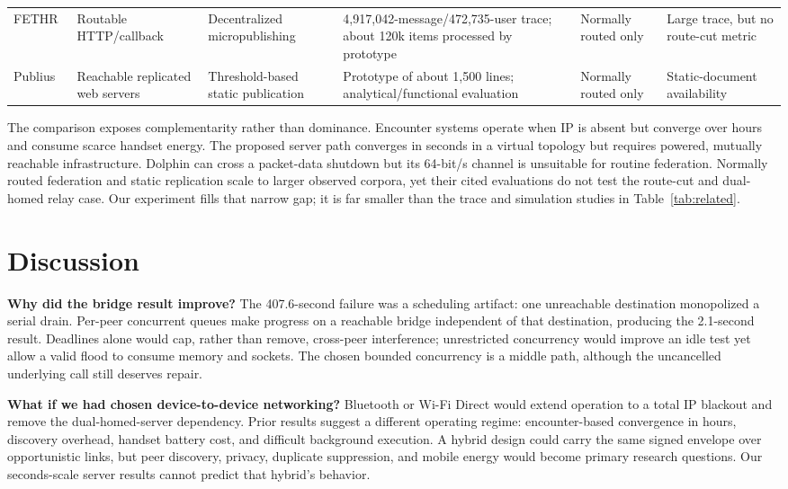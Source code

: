 \documentclass[sigconf,anonymous]{acmart}
\begin{document}
\begin{table}[t]
\begin{tabular}{p{1.55cm}p{2.05cm}p{1.55cm}p{3.35cm}p{2.1cm}p{2.55cm}}
FETHR~\cite{sandler2009fethr} & Routable HTTP/callback & Decentralized micropublishing & 4,917,042-message/472,735-user trace; about 120k items processed by prototype & Normally routed only & Large trace, but no route-cut metric \\
Publius~\cite{waldman2000publius} & Reachable replicated web servers & Threshold-based static publication & Prototype of about 1,500 lines; analytical/functional evaluation & Normally routed only & Static-document availability \\
\bottomrule
\end{tabular}
\end{table}

The comparison exposes complementarity rather than dominance. Encounter systems operate when IP is
absent but converge over hours and consume scarce handset energy. The proposed server path converges
in seconds in a virtual topology but requires powered, mutually reachable infrastructure. Dolphin can
cross a packet-data shutdown but its 64-bit/s channel is unsuitable for routine federation. Normally
routed federation and static replication scale to larger observed corpora, yet their cited
evaluations do not test the route-cut and dual-homed relay case. Our experiment fills that narrow gap;
it is far smaller than the trace and simulation studies in Table~\ref{tab:related}.

\section{Discussion}
\label{sec:discussion}

\textbf{Why did the bridge result improve?} The 407.6-second failure was a scheduling artifact: one
unreachable destination monopolized a serial drain. Per-peer concurrent queues make progress on a
reachable bridge independent of that destination, producing the 2.1-second result. Deadlines alone
would cap, rather than remove, cross-peer interference; unrestricted concurrency would improve an
idle test yet allow a valid flood to consume memory and sockets. The chosen bounded concurrency is a
middle path, although the uncancelled underlying call still deserves repair.

\textbf{What if we had chosen device-to-device networking?} Bluetooth or Wi-Fi Direct would extend
operation to a total IP blackout and remove the dual-homed-server dependency. Prior results suggest a
different operating regime: encounter-based convergence in hours, discovery overhead, handset
battery cost, and difficult background execution. A hybrid design could carry the same signed
envelope over opportunistic links, but peer discovery, privacy, duplicate suppression, and mobile
energy would become primary research questions. Our seconds-scale server results cannot predict that
hybrid's behavior.
\end{document}
